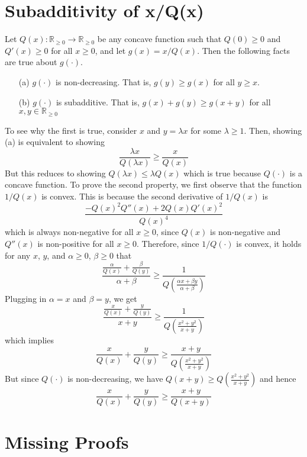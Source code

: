 \documentclass[11pt]{article}
\newcommand{\R}{{\mathbb R}}
\begin{document}
\section{Subadditivity of x/Q(x)}
\label{sec:subadditive}
Let $Q(x): \R_{\geq 0} \rightarrow \R_{\geq 0}$ be any concave function such that $Q(0) \geq 0$ and $Q'(x) \geq 0$ for all $x \geq 0$, and let $g(x) = x/Q(x)$. Then the following facts are true about $g(\cdot)$.
\begin{enumerate}
\item[(a)] $g(\cdot)$ is non-decreasing. That is, $g(y) \geq g(x)$ for all $y \geq x$.
\item[(b)] $g(\cdot)$ is subadditive. That is, $g(x) + g(y) \geq g(x+y)$ for all $x, y \in \R_{\geq 0}$
\end{enumerate}

To see why the first is true, consider $x$ and $y = \lambda x$ for some $\lambda \geq 1$. Then,
showing (a) is equivalent to showing
$$
\frac{\lambda x}{Q(\lambda x)} \geq \frac{x}{Q(x)}
$$
But this reduces to showing $Q(\lambda x) \leq \lambda Q(x)$ which is true because $Q(\cdot)$ is a concave function. To prove the second property, we first observe that the function $1/Q(x)$ is convex. This is because the second derivative of $1/Q(x)$ is
$$
\frac{-Q(x)^2 Q''(x) + 2 Q(x) Q'(x)^2}{Q(x)^4}
$$
which is always non-negative for all $x \geq 0$, since $Q(x)$ is non-negative and $Q''(x)$ is non-positive for all $x\geq 0$. Therefore, since $1/Q(\cdot)$ is convex, it holds for any $x$, $y$, and $\alpha \geq 0$, $\beta \geq 0$ that
$$
\frac{\frac{\alpha}{Q(x)} + \frac{\beta}{Q(y)}}{\alpha + \beta} \geq \frac{1}{Q(\frac{\alpha x + \beta y}{\alpha + \beta})}
$$
Plugging in $\alpha = x$ and $\beta = y$, we get
$$
\frac{\frac{x}{Q(x)} + \frac{y}{Q(y)}}{x + y} \geq \frac{1}{Q(\frac{x^2 + y^2}{x + y})}
$$
which implies
$$
\frac{x}{Q(x)} + \frac{y}{Q(y)} \geq \frac{x + y}{Q(\frac{x^2 + y^2}{x + y})}
$$
But since $Q(\cdot)$ is non-decreasing, we have $Q(x + y) \geq Q(\frac{x^2 + y^2}{x + y})$ and hence
$$
\frac{x}{Q(x)} + \frac{y}{Q(y)} \geq \frac{x + y}{Q(x + y)}
$$


\section{Missing Proofs}
\label{sec:missing-proofs}
\end{document}
